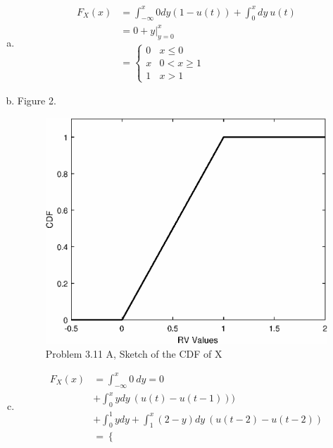 \documentclass[12pt]{article}
\newenvironment{problem}[2][Problem]{\begin{trivlist}
\item[\hskip \labelsep {\bfseries #1}\hskip \labelsep {\bfseries #2.}]
  \vspace{1 cm}
}{\end{trivlist}}
\begin{document}
\begin{problem}{3.11}
\item
  \begin{enumerate}[a.]
    \item %
      \begin{align*}
        F_X(x) &= \int_{-\infty}^{x} 0dy(1-u(t)) + \int_{0}^{x} dy  \ u(t) \\
        &= 0 + y\big|_{y=0}^x \\
        &=\begin{cases}
            0 & x \leq 0 \\
            x & 0 < x \geq 1 \\
            1 & x > 1
          \end{cases}
      \end{align*}
    \item Figure 2.
     \begin{figure}[htpb]
       \centering
       \includegraphics[width=\textwidth,height=\textheight,keepaspectratio]{fig_3_11_a.eps}
       \caption{Problem 3.11 A, Sketch of the CDF of X}
     \end{figure}
    \item
      \begin{align*}
        F_X(x) &= \int_{-\infty}^{x} 0 \ dy = 0 \\
          &+ \int_{0}^{x} y  dy \ (u(t)-u(t-1))) \\
          &+ \int_0^1 y  dy + \int_1^x (2-y)dy \ (u(t-2) - u(t-2)) \\
        &=\begin{cases}

\end{cases}
\end{align*}
\end{enumerate}
\end{problem}
\end{document}

